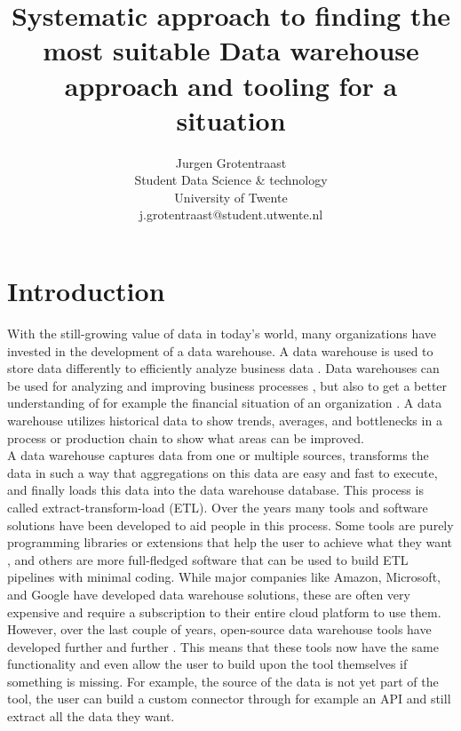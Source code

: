 \documentclass[11pt]{article}
\title{Systematic approach to finding the most suitable Data warehouse approach and tooling for a situation}
\author{Jurgen Grotentraast \\
  Student Data Science \& technology\\
  University of Twente \\
  j.grotentraast@student.utwente.nl\\}
\begin{document}
{\makeatletter\acl@finalcopytrue
  \maketitle
}

\section{Introduction}
With the still-growing value of data in today's world, many organizations have invested in the development of a data warehouse. A data warehouse is used to store data differently to efficiently analyze business data \cite{gupta1997selection}. Data warehouses can be used for analyzing and improving business processes \cite{shahzad2009goal}, but also to get a better understanding of for example the financial situation of an organization \cite{lapura2018development}. A data warehouse utilizes historical data to show trends, averages, and bottlenecks in a process or production chain to show what areas can be improved. \\

A data warehouse captures data from one or multiple sources, transforms the data in such a way that aggregations on this data are easy and fast to execute, and finally loads this data into the data warehouse database. This process is called extract-transform-load (ETL). Over the years many tools and software solutions have been developed to aid people in this process. Some tools are purely programming libraries or extensions that help the user to achieve what they want \cite{Thomsen201821, Jensen202145, Biswas_programming2019267}, and others are more full-fledged software that can be used to build ETL pipelines with minimal coding. While major companies like Amazon, Microsoft, and Google have developed data warehouse solutions, these are often very expensive and require a subscription to their entire cloud platform to use them. However, over the last couple of years, open-source data warehouse tools have developed further and further \cite{nejres2015analysis}. This means that these tools now have the same functionality and even allow the user to build upon the tool themselves if something is missing. For example, the source of the data is not yet part of the tool, the user can build a custom connector through for example an API and still extract all the data they want. \\
\end{document}
